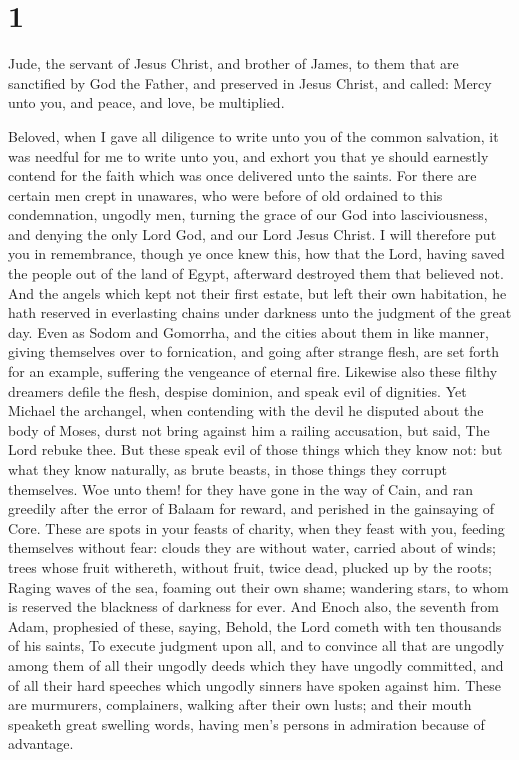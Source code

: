 \hypertarget{section}{%
\section{1}\label{section}}

 Jude, the servant of Jesus Christ, and brother of James, to
them that are sanctified by God the Father, and preserved in Jesus
Christ, and called:  Mercy unto you, and peace, and love, be
multiplied.

 Beloved, when I gave all diligence to write unto you of the
common salvation, it was needful for me to write unto you, and exhort
you that ye should earnestly contend for the faith which was once
delivered unto the saints.  For there are certain men crept
in unawares, who were before of old ordained to this condemnation,
ungodly men, turning the grace of our God into lasciviousness, and
denying the only Lord God, and our Lord Jesus Christ.  I
will therefore put you in remembrance, though ye once knew this, how
that the Lord, having saved the people out of the land of Egypt,
afterward destroyed them that believed not.  And the angels
which kept not their first estate, but left their own habitation, he
hath reserved in everlasting chains under darkness unto the judgment of
the great day.  Even as Sodom and Gomorrha, and the cities
about them in like manner, giving themselves over to fornication, and
going after strange flesh, are set forth for an example, suffering the
vengeance of eternal fire.  Likewise also these filthy
dreamers defile the flesh, despise dominion, and speak evil of
dignities.  Yet Michael the archangel, when contending with
the devil he disputed about the body of Moses, durst not bring against
him a railing accusation, but said, The Lord rebuke thee. 
But these speak evil of those things which they know not: but what they
know naturally, as brute beasts, in those things they corrupt
themselves.  Woe unto them! for they have gone in the way
of Cain, and ran greedily after the error of Balaam for reward, and
perished in the gainsaying of Core.  These are spots in
your feasts of charity, when they feast with you, feeding themselves
without fear: clouds they are without water, carried about of winds;
trees whose fruit withereth, without fruit, twice dead, plucked up by
the roots;  Raging waves of the sea, foaming out their own
shame; wandering stars, to whom is reserved the blackness of darkness
for ever.  And Enoch also, the seventh from Adam,
prophesied of these, saying, Behold, the Lord cometh with ten thousands
of his saints,  To execute judgment upon all, and to
convince all that are ungodly among them of all their ungodly deeds
which they have ungodly committed, and of all their hard speeches which
ungodly sinners have spoken against him.  These are
murmurers, complainers, walking after their own lusts; and their mouth
speaketh great swelling words, having men's persons in admiration
because of advantage.

